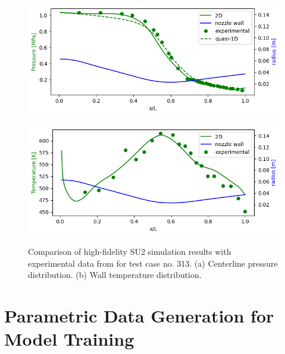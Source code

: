 \documentclass[tg, EN]{ufabcFHZh_tg}
\begin{document}
\begin{figure}[H]
    \centering
    \begin{minipage}[c]{0.9\textwidth}
        \centering
        \includegraphics[width=\textwidth]{Figuras/hf_validation_pressure.png}
        \label{fig:hf_validation_pressure}
    \end{minipage}
    \vspace{1em}
    \begin{minipage}[c]{0.9\textwidth}
        \centering
        \includegraphics[width=\textwidth]{Figuras/hf_validation_temperature.png}
        \label{fig:hf_validation_temperature}
    \end{minipage}
    \caption{Comparison of high-fidelity SU2 simulation results with experimental data from \citep{back1964} for test case no. 313. (a) Centerline pressure distribution. (b) Wall temperature distribution.}
    \label{fig:hf_validation}
\end{figure}


\section{Parametric Data Generation for Model Training}
\end{document}
